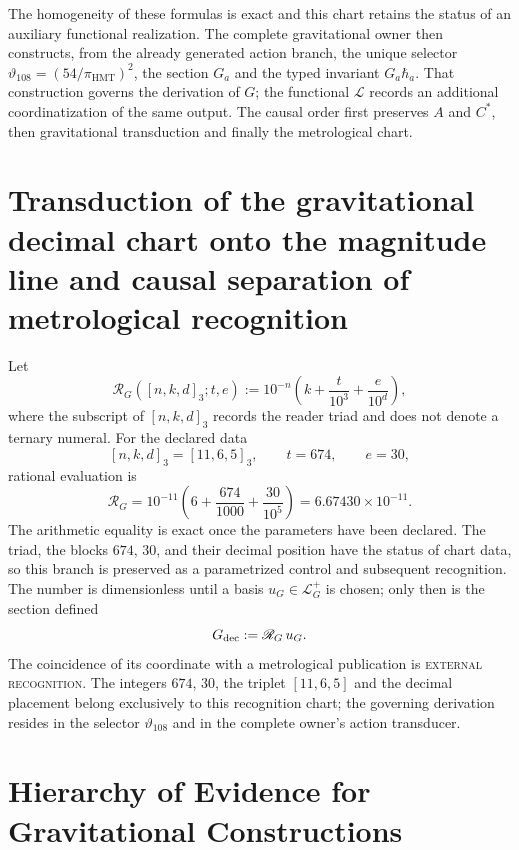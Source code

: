 The homogeneity of these formulas is exact and this chart retains the status
of an auxiliary functional realization. The complete gravitational owner
then constructs, from the already generated action branch, the unique selector
\(\vartheta_{108}=(54/\pi_{\mathrm{HMT}})^2\), the section \(G_a\) and the
typed invariant \(G_a\hbar_a\). That construction governs the derivation of
\(G\); the functional \(\mathscr L\) records an additional coordinatization of
the same output. The causal order first preserves \(A\) and \(C^\ast\), then
gravitational transduction and finally the metrological chart.

\section{Transduction of the gravitational decimal chart onto the magnitude line and causal separation of metrological recognition}
\label{sec:lector-decimal-independiente-G}

Let
\[
 \mathscr R_G([n,k,d]_3;t,e)
 :=10^{-n}\left(k+\frac{t}{10^3}+\frac{e}{10^d}\right),
\]
where the subscript of \([n,k,d]_3\) records the reader triad and does not denote
a ternary numeral. For the declared data
\[
 [n,k,d]_3=[11,6,5]_3,\qquad t=674,\qquad e=30,
\]
rational evaluation is
\[
 \boxed{
 \mathscr R_G
 =10^{-11}\left(6+\frac{674}{1000}+\frac{30}{10^5}\right)
 =6.67430\times10^{-11}.}
\]
The arithmetic equality is exact once the parameters have been declared. The triad,
the blocks \(674\), \(30\), and their decimal position have the status of chart
data, so this branch is preserved as a parametrized control and subsequent
recognition. The number is dimensionless until a basis
\(u_G\in\mathcal L_G^+\) is chosen; only then is the section defined
\[
 G_{\rm dec}:=\mathscr R_G\,u_G.
\]
The coincidence of its coordinate with a metrological publication is
\textsc{external recognition}. The integers \(674\), \(30\), the triplet
\([11,6,5]\) and the decimal placement belong exclusively to this recognition
chart; the governing derivation resides in the selector
\(\vartheta_{108}\) and in the complete owner's action transducer.

\section{Hierarchy of Evidence for Gravitational Constructions}
\label{sec:cuadrado-contraste-G}

